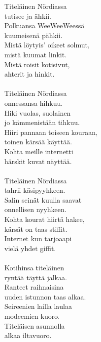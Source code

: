 
            Titeläinen Nördiassa \\
            tutisee ja ähkii. \\
            Polkuansa WeeWeeWeessä \\
            kuumeisenä pähkii. \\
            Mistä löytyis’ oikeet solmut, \\
            mistä kuumat linkit. \\
            Mistä roisit kotisivut, \\
            ahterit ja hinkit. \\
\hspace{10mm} \\
            Titeläinen Nördiassa \\
            onnessansa hihkuu. \\
            Hiki vuolas, suolainen \\
            jo kämmenistään tihkuu. \\
            Hiiri pannaan toiseen kouraan, \\
            toinen kärsää käyttää. \\
            Kohta meille internetti \\
            härskit kuvat näyttää. \\
\hspace{10mm} \\
            Titeläinen Nördiassa \\
            tahrii käsipyyhkeen. \\
            Salin seinät kuulla saavat \\
            onnellisen nyyhkeen. \\
            Kohta kourat hiirtä hakee, \\
            kärsät on taas stiffit. \\
            Internet kun tarjoaapi \\
            vielä yhdet giffit. \\
\hspace{10mm} \\
            Kotihinsa titeläinen \\
            ryntää täyttä jalkaa. \\
            Ranteet raihnaisina \\
            uuden istunnon taas alkaa. \\
            Seireenien lailla laulaa \\
            modeemien kuoro. \\
            Titeläisen asunnolla \\
            alkaa iltavuoro. \\
